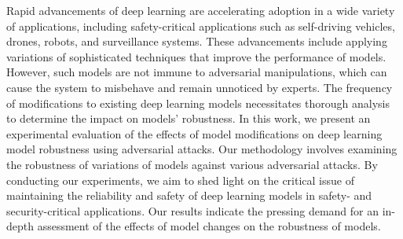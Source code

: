 Rapid advancements of deep learning are accelerating adoption in a wide variety of applications, including safety-critical applications such as self-driving vehicles, drones, robots, and surveillance systems.
These advancements include applying variations of sophisticated techniques that improve the performance of models.
However, such models are not immune to adversarial manipulations, which can cause the system to misbehave and remain unnoticed by experts.
The frequency of modifications to existing deep learning models necessitates thorough analysis to determine the impact on models' robustness. 
In this work, we present an experimental evaluation of the effects of model modifications on deep learning model robustness using adversarial attacks.
Our methodology involves examining the robustness of variations of models against various adversarial attacks.
By conducting our experiments, we aim to shed light on the critical issue of maintaining the reliability and safety of deep learning models in safety- and security-critical applications.
Our results indicate the pressing demand for an in-depth assessment of the effects of model changes on the robustness of models.